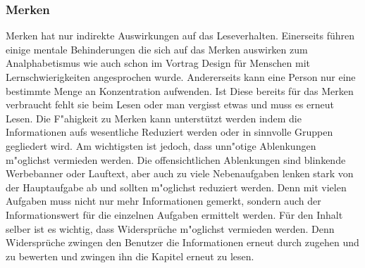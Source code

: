 \subsubsection{Merken}
Merken hat nur indirekte Auswirkungen auf das Leseverhalten. Einerseits führen einige mentale Behinderungen die sich auf das Merken auswirken zum Analphabetismus wie auch schon im Vortrag \glqq Design für Menschen mit Lernschwierigkeiten \grqq angesprochen wurde. Andererseits kann eine Person nur eine bestimmte Menge an Konzentration aufwenden. Ist Diese bereits für das Merken verbraucht fehlt sie beim Lesen oder man vergisst etwas und muss es erneut Lesen. 
Die F"ahigkeit zu Merken kann unterstützt werden indem die Informationen aufs wesentliche Reduziert werden oder in sinnvolle Gruppen gegliedert wird. Am wichtigsten ist jedoch, dass unn"otige Ablenkungen m"oglichst vermieden werden.
Die offensichtlichen Ablenkungen sind blinkende Werbebanner oder Lauftext, aber auch zu viele Nebenaufgaben lenken stark von der Hauptaufgabe ab und sollten m"oglichst reduziert werden. Denn mit vielen Aufgaben muss nicht nur mehr Informationen gemerkt, sondern auch der Informationswert für die einzelnen Aufgaben ermittelt werden. Für den Inhalt selber ist es wichtig, dass Widersprüche m"oglichst vermieden werden. Denn Widersprüche zwingen den Benutzer die Informationen erneut durch zugehen und zu bewerten und zwingen ihn die Kapitel erneut zu lesen.


